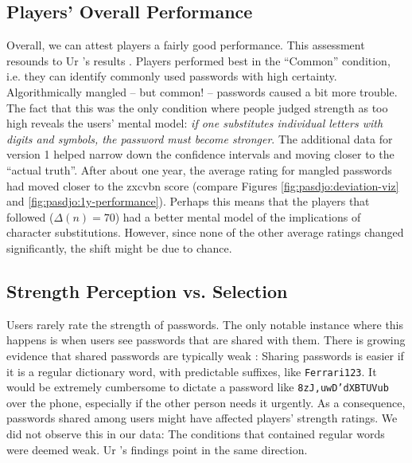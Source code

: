 \subsection{Players' Overall Performance}
Overall, we can attest players a fairly good performance. This assessment resounds to Ur \etal's results \cite{Ur2016PerceptionsPassword}. Players performed best in the ``Common'' condition, i.e. they can identify commonly used passwords with high certainty. Algorithmically mangled -- but common! -- passwords caused a bit more trouble. The fact that this was the only condition where people judged strength as too high reveals the users' mental model: \textit{if one substitutes individual letters with digits and symbols, the password must become stronger}. The additional data for version 1 helped narrow down the confidence intervals and moving closer to the ``actual truth''. After about one year, the average rating for mangled passwords had moved closer to the zxcvbn score (compare Figures \ref{fig:pasdjo:deviation-viz} and \ref{fig:pasdjo:1y-performance}). Perhaps this means that the players that followed ($\Delta(n)=70$) had a better mental model of the implications of character substitutions. However, since none of the other average ratings changed significantly, the shift might be due to chance. 

\subsection{Strength Perception vs. Selection}
Users rarely rate the strength of passwords. The only notable instance where this happens is when users see passwords that are shared with them. There is growing evidence that shared passwords are typically weak \cite{Haque2014Hierarchy,  Shay2010EncounteringPasswordRequirements, Singh2007PasswordSharing, Violettas2014PasswordsAvoidGreece, Weirich2001PrettyGoodPersuasion, ZhangKennedy2016RevisitingPasswordRules}: Sharing passwords is easier if it is a regular dictionary word, with predictable suffixes, like \texttt{Ferrari123}. It would be extremely cumbersome to dictate a password like \texttt{8zJ,uwD'dXBTUVub} over the phone, especially if the other person needs it urgently. As a consequence, passwords shared among users might have affected players' strength ratings. We did not observe this in our data: The conditions that contained regular words were deemed weak. Ur \etal's findings point in the same direction. 

